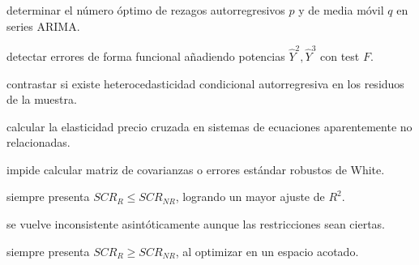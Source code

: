 \begin{opts}
    \item determinar el número óptimo de rezagos autorregresivos $p$ y de media móvil $q$ en series ARIMA.
    \item detectar errores de forma funcional añadiendo potencias $\hat{Y}^2, \hat{Y}^3$ con test $F$.
    \item contrastar si existe heterocedasticidad condicional autorregresiva en los residuos de la muestra.
    \item calcular la elasticidad precio cruzada en sistemas de ecuaciones aparentemente no relacionadas.
\end{opts}

\begin{opts}
    \item impide calcular matriz de covarianzas o errores estándar robustos de White.
    \item siempre presenta $SCR_R \le SCR_{NR}$, logrando un mayor ajuste de $R^2$.
    \item se vuelve inconsistente asintóticamente aunque las restricciones sean ciertas.
    \item siempre presenta $SCR_R \ge SCR_{NR}$, al optimizar en un espacio acotado.
\end{opts}

